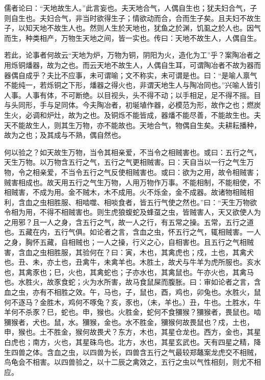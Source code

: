 \documentclass[]{article}
\begin{document}
儒者论曰：``天地故生人。''此言妄也。夫天地合气，人偶自生也；犹夫妇合气，子则自生也。夫妇合气，非当时欲得生子；情欲动而合，合而生子矣。且夫妇不故生子，以知天地不故生人也。然则人生於天地也，犹鱼之於渊，饥虱之於人也。因气而生，种类相产，万物生天地之间，皆一实也。传曰：天地不故生人，人偶自生。

若此，论事者何故云``天地为炉，万物为铜，阴阳为火，造化为工''乎？案陶冶者之用烁铜燔器，故为之也。而云天地不故生人，人偶自生耳，可谓陶冶者不故为器而器偶自成乎？夫比不应事，未可谓喻；文不称实，未可谓是也。曰：``是喻人禀气不能纯一，若烁铜之下形，燔器之得火也，非谓天地生人与陶冶同也。''兴喻人皆引人事。人事有体，不可断绝。以目视头，头不得不动；以手相足，足不得不摇。目与头同形，手与足同体。今夫陶冶者，初埏埴作器，必模范为形，故作之也；燃炭生火，必调和炉灶，故为之也。及铜烁不能皆成，器燔不能尽善，不能故生也。夫天不能故生人，则其生万物，亦不能故也。天地合气，物偶自生矣。夫耕耘播种，故为之也；及其成与不熟，偶自然也。

何以验之？如天故生万物，当令其相亲爱，不当令之相贼害也。或曰：五行之气，天生万物。以万物含五行之气，五行之气更相贼害。曰：天自当以一行之气生万物，令之相亲爱，不当令五行之气反使相贼害也。或曰：欲为之用，故令相贼害；贼害相成也。故天用五行之气生万物，人用万物作万事。不能相制，不能相使，不相贼害，不成为用。金不贼木，木不成用。火不烁金，金不成器。故诸物相贼相利，含血之虫相胜服、相啮噬、相啖食者，皆五行气使之然也。''曰：``天生万物欲令相为用，不得不相贼害也。则生虎狼蝮蛇及蜂虿之虫，皆贼害人，天又欲使人为之用邪？且一人之身，含五行之气，故一人之行，有五常之操。五常，五行之道也。五藏在内，五行气俱。如论者之言，含血之虫，怀五行之气，辄相贼害。一人之身，胸怀五藏，自相贼也；一人之操，行义之心，自相害也。且五行之气相贼害，含血之虫相胜服，其验何在？曰：寅，木也，其禽虎也；戍，土也，其禽犬也。丑、未，亦土也，丑禽牛，未禽羊也。木胜土，故犬与牛羊为虎所服也。亥水也，其禽豕也；巳，火也，其禽蛇也；子亦水也，其禽鼠也。午亦火也，其禽马也。水胜火，故豕食蛇；火为水所害，故马食鼠屎而腹胀。曰：审如论者之言，含血之虫，亦有不相胜之效。午，马也，子，鼠也，酉，鸡也，卯兔也。水胜火，鼠何不逐马？金胜木，鸡何不啄兔？亥，豕也，（未，羊也。）丑，牛也。土胜水，牛羊何不杀豕？巳，蛇也。申，猴也。火胜金，蛇何不食獼猴？獼猴者，畏鼠也。啮獼猴者，犬也。鼠，水。獼猴，金也。水不胜金，獼猴何故畏鼠也？戍，土也，申，猴也。土不胜金，猴何故畏犬？东方，木也，其星仓龙也。西方，金也，其星白虎也；南方，火也，其星硃鸟也。北方，水也，其星玄武也。天有四星之精，降生四兽之体。含血之虫，以四兽为长，四兽含五行之气最较郑鼇案龙虎交不相贼，鸟龟会不相害。以四兽验之，以十二辰之禽效之，五行之虫以气性相刻，则尤不相应。
\end{document}
